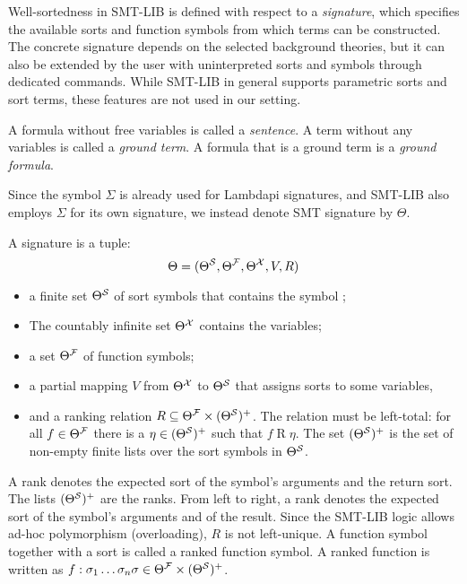 Well-sortedness in SMT-LIB is defined with respect to a \emph{signature}, which specifies the available sorts and function symbols from which terms can be constructed.
The concrete signature depends on the selected background theories, but it can also be extended by the user with uninterpreted sorts and symbols through dedicated commands.
While SMT-LIB in general supports parametric sorts and sort terms, these features are not used in our setting.


A formula without free variables is called a \emph{sentence}.
A term without any variables is called a \emph{ground term}. A formula that is a ground term is a \emph{ground formula}.

\begin{notation}
Since the symbol $\Sigma$ is already used for Lambdapi signatures, and SMT-LIB also employs $\Sigma$ for its own signature, we instead denote SMT signature by $\Theta$.  
\end{notation}

\begin{definition}[Signature]\label{def:smt-signature}
A signature is a tuple:
\[
    \Theta = (\Theta^\cal{S}, \Theta^\cal{F}, \Theta^\cal{X}, V, R)
\]
\begin{itemize}
    \item  a finite set $\Theta^\cal{S}$  of sort symbols that contains the symbol ;
    \item The countably infinite set $\Theta^\cal{X}$ contains the variables;
    \item a set $\Theta^\cal{F}$ of function symbols;
    \item a partial mapping $V$ from $\Theta^\cal{X}$ to $\Theta^\cal{S}$ that assigns sorts to some variables,
    \item and a ranking relation $R \subseteq \Theta^\cal{F} \times (\Theta^\cal{S})^+$. The relation must be left-total: for
    all $f \in \Theta^\cal{F}$ there is a $\eta \in (\Theta^\cal{S})^+$ such that $f \mathrel{R} \eta$. The set $(\Theta^\cal{S})^+$ 
    is the set of non-empty finite lists over the sort symbols in $\Theta^\cal{S}$.
\end{itemize}
\end{definition}

A rank denotes the expected sort of the symbol's arguments and the return sort. The lists $(\Theta^\cal{S})^+$ are the ranks.
From left to right, a rank denotes the expected sort of the symbol's arguments and of the result.
Since the SMT-LIB logic allows ad-hoc polymorphism (overloading), $R$ is not left-unique.
A function symbol together with a sort is called a ranked function symbol.
A ranked function is written as $f: \sigma_1\dots\sigma_n\sigma \in \Theta^{\cal{F}} \times (\Theta^{\cal{S}})^+$.

